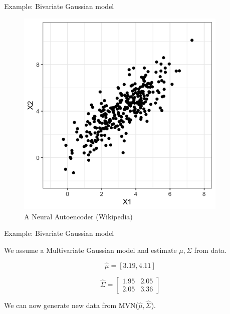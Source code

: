 \documentclass[10pt]{beamer}
\begin{document}
\begin{frame}{Example: Bivariate Gaussian model}

\begin{figure}[h]
\centering
\includegraphics[width=0.9\textwidth]{fig/bi_data.png}
\caption{A Neural Autoencoder (Wikipedia)}
\end{figure}

\end{frame}

\begin{frame}{Example: Bivariate Gaussian model}

We assume a Multivariate Gaussian model and estimate $\mu,\Sigma$ from data.

\[
\hat{\mu} = [3.19, 4.11]
\]

\[
\hat{\Sigma} = \begin{bmatrix} 1.95 & 2.05\\ 2.05 & 3.36 \end{bmatrix}
\]

We can now generate new data from MVN($\hat{\mu},\hat{\Sigma}$).

\end{frame}
\end{document}
